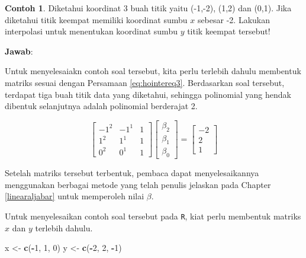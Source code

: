\documentclass[
]{book}
\newenvironment{Shaded}{\begin{snugshade}}{\end{snugshade}}
\newcommand{\DecValTok}[1]{\textcolor[rgb]{0.00,0.00,0.81}{#1}}
\newcommand{\FunctionTok}[1]{\textcolor[rgb]{0.13,0.29,0.53}{\textbf{#1}}}
\newcommand{\NormalTok}[1]{#1}
\newcommand{\OtherTok}[1]{\textcolor[rgb]{0.56,0.35,0.01}{#1}}
\newcommand{\SpecialCharTok}[1]{\textcolor[rgb]{0.81,0.36,0.00}{\textbf{#1}}}
\theoremstyle{definition}
\theoremstyle{definition}
\newtheorem{example}{Contoh}[chapter]
\theoremstyle{definition}
\theoremstyle{definition}
\theoremstyle{remark}
\begin{document}
\begin{example}
\protect\hypertarget{exm:hopoliexmp}{}\label{exm:hopoliexmp}Diketahui koordinat 3 buah titik yaitu (-1,-2), (1,2) dan (0,1). Jika diketahui titik keempat memiliki koordinat sumbu \(x\) sebesar -2. Lakukan interpolasi untuk menentukan koordinat sumbu \(y\) titik keempat tersebut!
\end{example}

\textbf{Jawab}:

Untuk menyelesaiakn contoh soal tersebut, kita perlu terlebih dahulu membentuk matriks sesuai dengan Persamaan \eqref{eq:hointereq3}. Berdasarkan soal tersebut, terdapat tiga buah titik data yang diketahui, sehingga polinomial yang hendak dibentuk selanjutnya adalah polinomial berderajat 2.

\begin{equation*}
\begin{bmatrix}
     -1^2   & -1^{1}  & 1            \\[0.3em]
     1^2    & 1^{1}   & 1            \\[0.3em]
     0^2    & 0^{1}   & 1
     \end{bmatrix}
\begin{bmatrix}
     \beta_2                                          \\[0.3em]
     \beta_1                                          \\[0.3em]
     \beta_0                                       
     \end{bmatrix}
= \begin{bmatrix}
     -2                                          \\[0.3em]
     2                                           \\[0.3em]
     1                                       
     \end{bmatrix}
\end{equation*}

Setelah matriks tersebut terbentuk, pembaca dapat menyelesaikannya menggunakan berbagai metode yang telah penulis jelaskan pada Chapter \ref{linearaljabar} untuk memperoleh nilai \(\beta\).

Untuk menyelesaikan contoh soal tersebut pada \texttt{R}, kiat perlu membentuk matriks \(x\) dan \(y\) terlebih dahulu.

\begin{Shaded}
\begin{Highlighting}[]
\NormalTok{x }\OtherTok{\textless{}{-}} \FunctionTok{c}\NormalTok{(}\SpecialCharTok{{-}}\DecValTok{1}\NormalTok{, }\DecValTok{1}\NormalTok{, }\DecValTok{0}\NormalTok{)}
\NormalTok{y }\OtherTok{\textless{}{-}} \FunctionTok{c}\NormalTok{(}\SpecialCharTok{{-}}\DecValTok{2}\NormalTok{, }\DecValTok{2}\NormalTok{, }\SpecialCharTok{{-}}\DecValTok{1}\NormalTok{)}
\end{Highlighting}
\end{Shaded}
\end{document}
